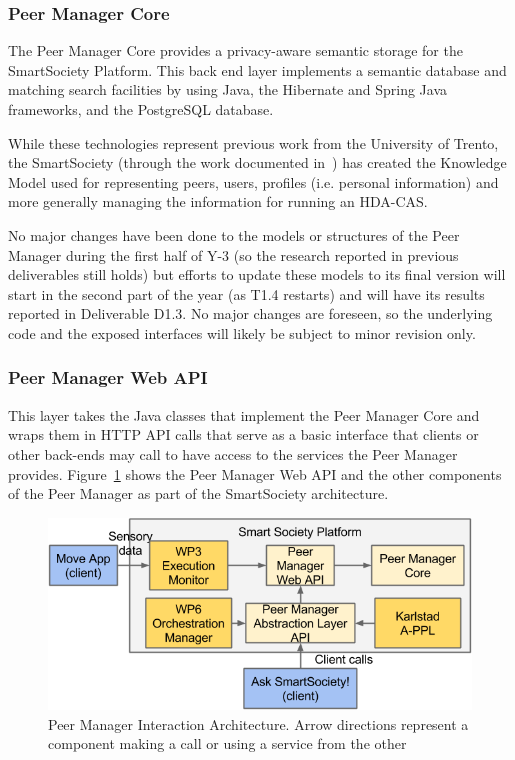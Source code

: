 \subsubsection{Peer Manager Core}
The Peer Manager Core provides a privacy-aware semantic storage for the SmartSociety Platform. This back end layer implements a semantic database and matching search facilities by using Java, the Hibernate and Spring Java frameworks, and the PostgreSQL database.

While these technologies represent previous work from the University of Trento, the SmartSociety (through the work documented in~\cite{D1.1,D4.1,D4.2}) has created the Knowledge Model used for representing peers, users, profiles (i.e. personal information) and more generally managing the information for running an HDA-CAS.

No major changes have been done to the models or structures of the Peer Manager during the first half of Y-3 (so the research reported in previous deliverables still holds) but efforts to update these models to its final version will start in the second part of the year (as T1.4 restarts) and will have its results reported in Deliverable D1.3. No major changes are foreseen, so the underlying code and the exposed interfaces will likely be subject to minor revision only. 

\subsubsection{Peer Manager Web API} \label{ssec:pm-web-api}
This layer takes the Java classes that implement the Peer Manager Core and wraps them in HTTP API calls that serve as a basic interface that clients or other back-ends may call to have access to the services the Peer Manager provides. Figure~\ref{fig:pm-interaction-arch.png} shows the Peer Manager Web API and the other components of the Peer Manager as part of the SmartSociety architecture. 

\begin{figure}[htb!]
\centering
\includegraphics[width=1\linewidth]{figures/pm-interaction-arch.png}
\caption{Peer Manager Interaction Architecture. Arrow directions represent a component making a call or using a service from the other}
\label{fig:pm-interaction-arch.png}
\end{figure}

